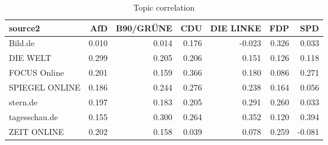 \begin{table}[ht]
\centering
\begin{tabular}{lrrrrrr}
  \hline
source2 & AfD & B90/GRÜNE & CDU & DIE LINKE & FDP & SPD \\ 
  \hline
Bild.de & 0.010 & 0.014 & 0.176 & -0.023 & 0.326 & 0.033 \\ 
  DIE WELT & 0.299 & 0.205 & 0.206 & 0.151 & 0.126 & 0.118 \\ 
  FOCUS Online & 0.201 & 0.159 & 0.366 & 0.180 & 0.086 & 0.271 \\ 
  SPIEGEL ONLINE & 0.186 & 0.244 & 0.276 & 0.238 & 0.164 & 0.056 \\ 
  stern.de & 0.197 & 0.183 & 0.205 & 0.291 & 0.260 & 0.033 \\ 
  tagesschau.de & 0.155 & 0.300 & 0.264 & 0.352 & 0.120 & 0.394 \\ 
  ZEIT ONLINE & 0.202 & 0.158 & 0.039 & 0.078 & 0.259 & -0.081 \\ 
   \hline
\end{tabular}
\caption{Topic correlation} 
\end{table}
